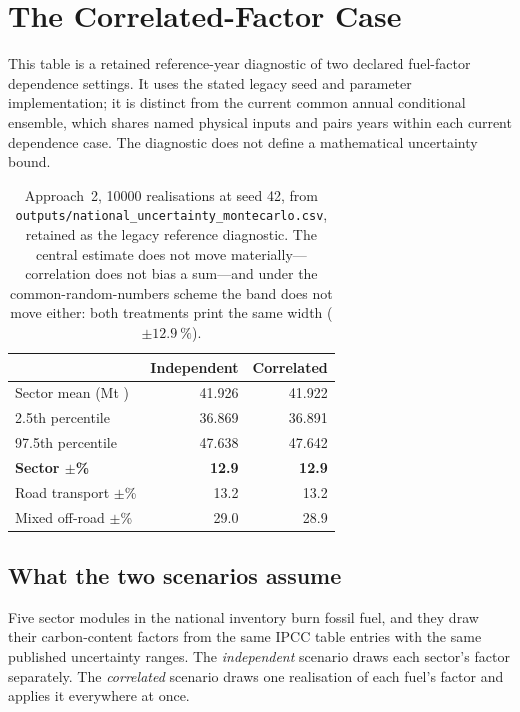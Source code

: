 \section{The Correlated-Factor Case}
\label{app:uncertainty}

This table is a retained reference-year diagnostic of two declared fuel-factor dependence settings. It uses the stated legacy seed and parameter implementation; it is distinct from the current common annual conditional ensemble, which shares named physical inputs and pairs years within each current dependence case. The diagnostic does not define a mathematical uncertainty bound.

\begin{table}[htbp]
\centering
\footnotesize
\begin{tabular}{@{}lrr@{}}
\toprule
& \textbf{Independent} & \textbf{Correlated} \\
\midrule
Sector mean (Mt \COe{}) & 41.926 & 41.922 \\
2.5th percentile        & 36.869 & 36.891 \\
97.5th percentile       & 47.638 & 47.642 \\
\textbf{Sector $\pm$\%} & \textbf{12.9} & \textbf{12.9} \\
\midrule
Road transport $\pm$\%     & 13.2 & 13.2 \\
Mixed off-road $\pm$\%     & 29.0 & 28.9 \\
\bottomrule
\end{tabular}
\caption{Approach~2, \num{10000} realisations at seed \num{42}, from
\texttt{outputs/national\_uncertainty\_montecarlo.csv}, retained as the legacy reference diagnostic. The central estimate does not
move materially---correlation does not bias a sum---and under the common-random-numbers
scheme the band does not move either: both treatments print the same width ($\pm\SI{12.9}{\percent}$).}
\label{tab:mc}
\end{table}

\subsection{What the two scenarios assume}

Five sector modules in the national inventory burn fossil fuel, and they draw their
carbon-content factors from the same IPCC table entries with the same published uncertainty
ranges. The \emph{independent} scenario draws each sector's factor separately. The
\emph{correlated} scenario draws one realisation of each fuel's factor and applies it
everywhere at once.

